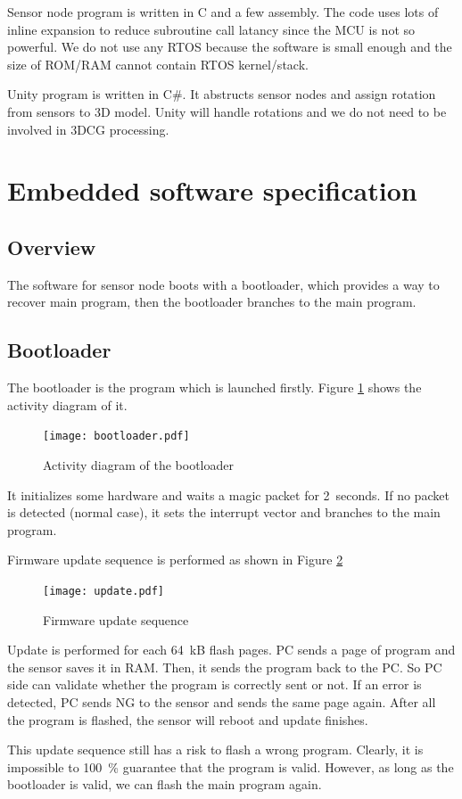 \documentclass[journal]{IEEEtran}
\begin{document}
Sensor node program is written in C and a few assembly.
The code uses lots of inline expansion to reduce subroutine call latancy since the MCU is not so powerful.
We do not use any RTOS because the software is small enough and the size of ROM/RAM cannot contain RTOS kernel/stack.

Unity program is written in C\#.
It abstructs sensor nodes and assign rotation from sensors to 3D model.
Unity will handle rotations and we do not need to be involved in 3DCG processing.

\section{Embedded software specification}
\subsection{Overview}
The software for sensor node boots with a bootloader, which provides a way to recover main program, then the bootloader branches to the main program.

\subsection{Bootloader}
The bootloader is the program which is launched firstly.
Figure \ref{boot-act} shows the activity diagram of it.
\begin{figure}[tb]
    \centering
    \texttt{[image: bootloader.pdf]}
    \caption{Activity diagram of the bootloader} \label{boot-act}
\end{figure}
It initializes some hardware and waits a magic packet for \SI{2}{seconds}.
If no packet is detected (normal case), it sets the interrupt vector and branches to the main program.

Firmware update sequence is performed as shown in Figure \ref{boot-upd}
\begin{figure}[tb]
    \centering
    \texttt{[image: update.pdf]}
    \caption{Firmware update sequence} \label{boot-upd}
\end{figure}
Update is performed for each \SI{64}{kB} flash pages.
PC sends a page of program and the sensor saves it in RAM.
Then, it sends the program back to the PC.
So PC side can validate whether the program is correctly sent or not.
If an error is detected, PC sends NG to the sensor and sends the same page again.
After all the program is flashed, the sensor will reboot and update finishes.

This update sequence still has a risk to flash a wrong program.
Clearly, it is impossible to \SI{100}{\percent} guarantee that the program is valid.
However, as long as the bootloader is valid, we can flash the main program again.
\end{document}
